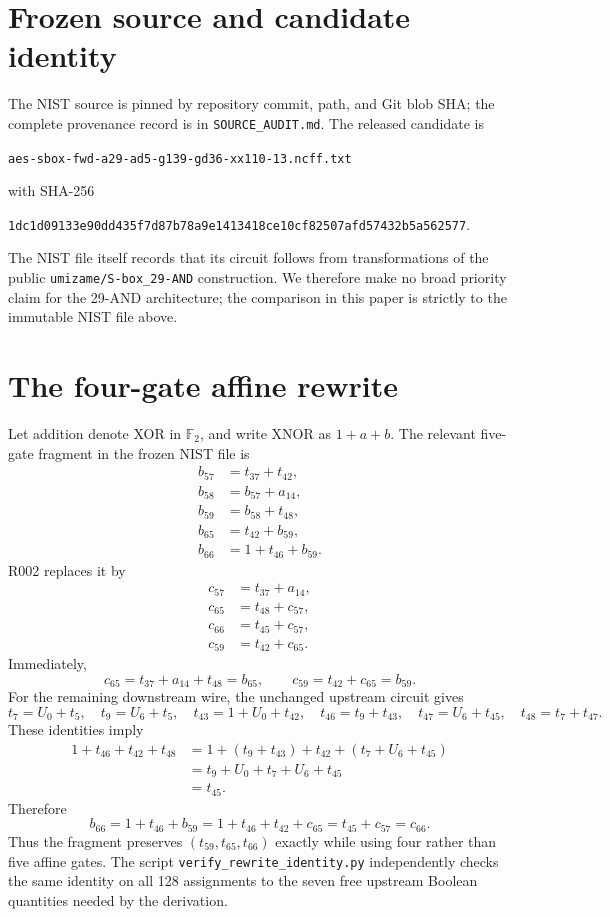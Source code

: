\documentclass[11pt]{article}
\newcommand{\F}{\mathbb{F}}
\begin{document}
\section{Frozen source and candidate identity}
The NIST source is pinned by repository commit, path, and Git blob SHA; the complete provenance record is in \texttt{SOURCE\_AUDIT.md}.  The released candidate is
\begin{center}
\texttt{aes-sbox-fwd-a29-ad5-g139-gd36-xx110-13.ncff.txt}
\end{center}
with SHA-256
\begin{center}
\small\texttt{1dc1d09133e90dd435f7d87b78a9e1413418ce10cf82507afd57432b5a562577}.
\end{center}
The NIST file itself records that its circuit follows from transformations of the public \texttt{umizame/S-box\_29-AND} construction.  We therefore make no broad priority claim for the 29-AND architecture; the comparison in this paper is strictly to the immutable NIST file above.

\section{The four-gate affine rewrite}
Let addition denote XOR in \(\F_2\), and write XNOR as \(1+a+b\).  The relevant five-gate fragment in the frozen NIST file is
\begin{align*}
 b_{57}&=t_{37}+t_{42},\\
 b_{58}&=b_{57}+a_{14},\\
 b_{59}&=b_{58}+t_{48},\\
 b_{65}&=t_{42}+b_{59},\\
 b_{66}&=1+t_{46}+b_{59}.
\end{align*}
R002 replaces it by
\begin{align*}
 c_{57}&=t_{37}+a_{14},\\
 c_{65}&=t_{48}+c_{57},\\
 c_{66}&=t_{45}+c_{57},\\
 c_{59}&=t_{42}+c_{65}.
\end{align*}
Immediately,
\[
  c_{65}=t_{37}+a_{14}+t_{48}=b_{65},\qquad
  c_{59}=t_{42}+c_{65}=b_{59}.
\]
For the remaining downstream wire, the unchanged upstream circuit gives
\[
 t_7=U_0+t_5,\quad t_9=U_6+t_5,\quad
 t_{43}=1+U_0+t_{42},\quad
 t_{46}=t_9+t_{43},\quad
 t_{47}=U_6+t_{45},\quad
 t_{48}=t_7+t_{47}.
\]
These identities imply
\begin{align*}
1+t_{46}+t_{42}+t_{48}
 &=1+(t_9+t_{43})+t_{42}+(t_7+U_6+t_{45})\\
 &=t_9+U_0+t_7+U_6+t_{45}\\
 &=t_{45}.
\end{align*}
Therefore
\[
 b_{66}=1+t_{46}+b_{59}
       =1+t_{46}+t_{42}+c_{65}
       =t_{45}+c_{57}=c_{66}.
\]
Thus the fragment preserves \((t_{59},t_{65},t_{66})\) exactly while using four rather than five affine gates.  The script \texttt{verify\_rewrite\_identity.py} independently checks the same identity on all 128 assignments to the seven free upstream Boolean quantities needed by the derivation.
\end{document}
